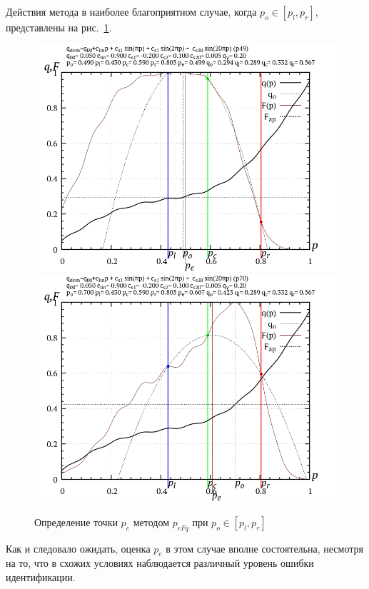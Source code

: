 Действия метода в наиболее благоприятном случае, когда
 $p_o \in [p_l,p_r]$, представлены на рис.~\ref{atu:f:p_eFq_intra}.


\begin{figure}[htb!]
  \centerline{
    \includegraphics[width=49\TW]{p/p_eFq/q_p_eFq_p49.png}
    \hfill
    \includegraphics[width=49\TW]{p/p_eFq/q_p_eFq_p70.png}
  }
  \caption{Определение точки $p_e$ методом $p_{eFq}$ при   $p_o \in [p_l,p_r]$}
  \label{atu:f:p_eFq_intra}
\end{figure}

Как и следовало ожидать, оценка $p_e$ в этом случае вполне состоятельна,
несмотря на то, что в схожих условиях
наблюдается различный уровень ошибки идентификации.

